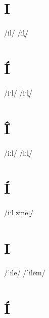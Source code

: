 \documentclass[10pt,a4paper,twoside]{book}
\begin{document}
\section*{I}

\begin{multicols}{3}
 {/il/} {}
 {/il̥/} {}
\end{multicols}

\section*{Í}

\begin{multicols}{3}
 {/iˑl/} {}
 {/iˑl̥/} {}
\end{multicols}

\section*{Î}

\begin{multicols}{3}
 {/iːl/} {}
 {/iːl̥/} {}
\end{multicols}

\section*{Í}

\begin{multicols}{3}
 {/iˑl zmeɪ̯/} {}
\end{multicols}

\section*{I}

\begin{multicols}{3}
 {/ˈile/} {}
 {/ˈilem/} {}
\end{multicols}

\section*{Í}
\end{document}
